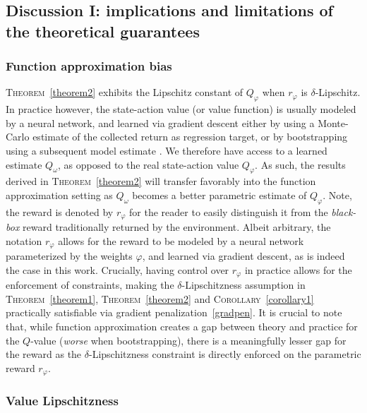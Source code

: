 \subsection{Discussion I: implications and limitations of the theoretical guarantees}
\label{discussion}

\subsubsection{Function approximation bias}

\textsc{Theorem}~\ref{theorem2} exhibits the Lipschitz constant of $Q_\varphi$
when $r_\varphi$ is $\delta$-Lipschitz.
In practice however, the state-action value (or value function) is usually modeled
by a neural network, and learned via gradient descent
either by using a Monte-Carlo estimate of the collected return as regression target,
or by bootstrapping using a subsequent model estimate \cite{Sutton1988-to}.
We therefore have access to a learned estimate $Q_\omega$, as opposed to the real
state-action value $Q_\varphi$.
As such, the results derived in \textsc{Theorem}~\ref{theorem2} will transfer favorably into
the function approximation setting as $Q_\omega$ becomes
a better parametric estimate of $Q_\varphi$.
Note, the reward is denoted by $r_\varphi$ for the reader to easily distinguish it
from the \emph{black-box} reward traditionally returned by the environment.
Albeit arbitrary, the notation $r_\varphi$ allows for the reward to be modeled by
a neural network parameterized by the weights $\varphi$, and learned via gradient descent,
as is indeed the case in this work.
Crucially, having control over $r_\varphi$ in practice allows for the enforcement of constraints,
making the $\delta$-Lipschitzness assumption in \textsc{Theorem}~\ref{theorem1},
\textsc{Theorem}~\ref{theorem2} and \textsc{Corollary}~\ref{corollary1}
practically satisfiable via gradient penalization~\ref{gradpen}.
It is crucial to note that, while function approximation creates a gap between
theory and practice for the $Q$-value (\emph{worse} when bootstrapping),
there is a meaningfully lesser gap for the reward as
the $\delta$-Lipschitzness constraint is directly enforced on the parametric reward $r_\varphi$.

\subsubsection{Value Lipschitzness}

